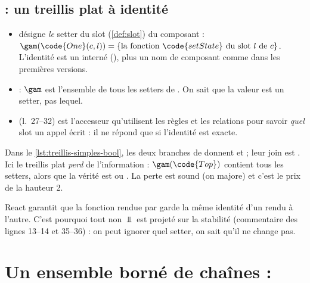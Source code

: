 \subsection{ : un treillis plat à identité}


\begin{itemize}
  \item {} désigne \emph{le} setter du slot
     (\cref{def:slot}) du composant  :
    $\gam(\code{One}(c,l)) = \{\text{la fonction }\code{setState}\text{ du
    slot } l \text{ de } c\}$. L'identité est un  interné
    (), plus un nom de composant comme dans les premières versions.
  \item {} : $\gam$ est l'ensemble de tous les setters de
    . On sait que la valeur est un setter, pas lequel.
  \item {} (l.~27--32) est l'accesseur qu'utilisent les règles et
    les relations pour savoir \emph{quel} slot un appel écrit : il ne répond
    que si l'identité est exacte.
\end{itemize}

Dans le \cref{lst:treillis-simples-bool}, les deux branches de
 donnent  et  ; leur
join est . Ici le treillis plat \emph{perd} de l'information :
$\gam(\code{Top})$ contient tous les setters, alors que la vérité est
\og {} ou \fg{}. La perte est sound (on majore) et c'est le
prix de la hauteur 2.

\begin{react}
  React garantit que la fonction  rendue par 
  garde la même identité d'un rendu à l'autre. C'est pourquoi tout
   non $\Bot$ est projeté sur la stabilité 
  (commentaire des lignes 13--14 et 35--36) : on peut ignorer quel setter,
  on sait qu'il ne change pas.
\end{react}

\section{Un ensemble borné de chaînes : }
\label{sec:treillis-simples-strconst}

